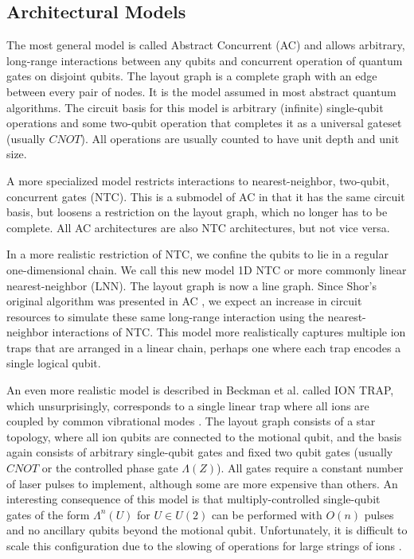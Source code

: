 \subsection{Architectural Models}
\label{subsec:models}

The most general model is called Abstract Concurrent (\textsf{AC})
and allows arbitrary, long-range interactions between any qubits and concurrent
operation of quantum gates on disjoint qubits.
The layout graph is a complete graph with an edge between every pair of nodes.
It is the model assumed in most abstract quantum algorithms. 
The circuit basis
for this model is arbitrary (infinite) single-qubit operations and some
two-qubit operation that completes it as a universal gateset (usually $CNOT$).
All operations are usually counted to have unit depth and unit size.

A more specialized model restricts interactions to nearest-neighbor, two-qubit,
concurrent gates (\textsf{NTC}). This is a submodel of \textsf{AC} in that it
has the same circuit basis, but loosens a restriction on the layout graph,
which no longer has to be complete. All \textsf{AC} architectures
are also \textsf{NTC} architectures, but not vice versa.

In a more realistic restriction of \textsf{NTC}, we confine the qubits to
lie in a regular one-dimensional chain. We call this new model
\textsf{1D NTC} or more commonly
linear nearest-neighbor (\textsf{LNN}).
The layout graph is now a line graph.
Since Shor's original algorithm was
presented in \textsf{AC} \cite{Shor1994}, we expect an increase in circuit resources to
simulate these same long-range interaction using the nearest-neighbor
interactions of \textsf{NTC}. This model more realistically captures multiple
ion traps that are arranged in a linear chain, perhaps one where each
trap encodes a single logical qubit.

An even more realistic model is described in Beckman et al.
\cite{Beckman1996} called \textsf{ION TRAP}, which unsurprisingly,
corresponds to a single linear trap where all ions are coupled by
common vibrational modes \cite{Cirac1995}.
The layout graph consists of a star topology,
where all ion qubits are connected to the motional qubit, and the basis
again consists of arbitrary single-qubit gates and fixed two qubit
gates (usually $CNOT$ or the controlled phase gate $\Lambda(Z)$).
All gates require
a constant number of laser pulses to implement, although some are more
expensive than others. An interesting consequence of this model is that
multiply-controlled single-qubit gates of the form $\Lambda^n(U)$ for
$U \in U(2)$ can be performed with $O(n)$ pulses and no ancillary qubits
beyond the motional qubit. Unfortunately, it is difficult to scale
this configuration due to the slowing of operations for large strings of
ions \cite{Haffner2008}.


